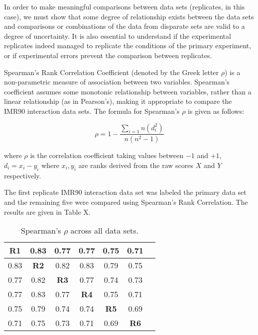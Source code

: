 In order to make meaningful comparisons between data sets (replicates,
in this case), we must show that some degree of relationship exists between
the data sets and comparisons or combinations of the data from disparate sets
are valid to a degree of uncertainty.  It is also essential to understand if the
experimental replicates indeed managed to replicate the conditions of the primary
experiment, or if experimental errors prevent the comparison between replicates.

Spearman's Rank Correlation Coefficient (denoted by the Greek letter $\rho$) is
a non-parametric measure of association between two variables.
Spearman's coefficient assumes some monotonic relationship between variables,
rather than a linear relationship (as in Pearson's), making it appropriate
to compare the IMR90 interaction data sets.  The formula for Spearman's $\rho$ is
given as follows:

\begin{equation}
\rho = 1 - \frac{\sum_{i=1}{n}(d_i^2)}{n(n^2 - 1)}
\end{equation}

where $\rho$ is the correlation coefficient taking values between $-1$ and $+1$,
$d_i = x_i - y_i$ where $x_i, y_i$ are ranks derived from the raw scores $X$ and
$Y$ respectively.

The first replicate IMR90 interaction data set was labeled the primary data set
and the remaining five were compared using Spearman's Rank Correlation.  The
results are given in Table X.

\begin{table}
  \begin{tabular}{|c|*{6}{c|}}
    \toprule
    \textbf{R1} & 0.83 & 0.77 & 0.77 & 0.75 & 0.71 \\ \midrule
    0.83 & \textbf{R2} & 0.82 & 0.83 & 0.79 & 0.75 \\ \midrule
    0.77 & 0.82 & \textbf{R3} & 0.77 & 0.74 & 0.73 \\ \midrule
    0.77 & 0.83 & 0.77 & \textbf{R4} & 0.75 & 0.71 \\ \midrule
    0.75 & 0.79 & 0.74 & 0.74 & \textbf{R5} & 0.69 \\ \midrule
    0.71 & 0.75 & 0.73 & 0.71 & 0.69 & \textbf{R6} \\ \midrule
  \end{tabular}
  \caption{Spearman's $\rho$ across all data sets.}
\label{tab:correlations}
\end{table}
